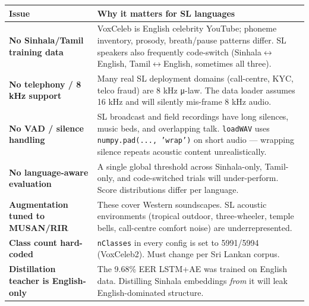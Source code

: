 \documentclass[10pt,a4paper]{article}
\renewcommand{\arraystretch}{1.15}
\begin{document}
\begin{center}
\small
\renewcommand{\arraystretch}{1.25}
\begin{tabularx}{\textwidth}{|Y|Y|}
\hline
Issue & Why it matters for SL languages \\
\hline
\textbf{No Sinhala/Tamil training data} & VoxCeleb is English celebrity YouTube; phoneme inventory, prosody, breath/pause patterns differ. SL speakers also frequently code-switch (Sinhala$\leftrightarrow$English, Tamil$\leftrightarrow$English, sometimes all three). \\
\hline
\textbf{No telephony / 8 kHz support} & Many real SL deployment domains (call-centre, KYC, telco fraud) are 8 kHz μ-law. The data loader assumes 16 kHz and will silently mis-frame 8 kHz audio. \\
\hline
\textbf{No VAD / silence handling} & SL broadcast and field recordings have long silences, music beds, and overlapping talk. \texttt{loadWAV} uses \texttt{numpy.pad(..., 'wrap')} on short audio --- wrapping silence repeats acoustic content unrealistically. \\
\hline
\textbf{No language-aware evaluation} & A single global threshold across Sinhala-only, Tamil-only, and code-switched trials will under-perform. Score distributions differ per language. \\
\hline
\textbf{Augmentation tuned to MUSAN/RIR} & These cover Western soundscapes. SL acoustic environments (tropical outdoor, three-wheeler, temple bells, call-centre comfort noise) are underrepresented. \\
\hline
\textbf{Class count hard-coded} & \texttt{nClasses} in every config is set to 5991/5994 (VoxCeleb2). Must change per Sri Lankan corpus. \\
\hline
\textbf{Distillation teacher is English-only} & The 9.68\% EER LSTM+AE was trained on English data. Distilling Sinhala embeddings \textit{from} it will leak English-dominated structure. \\
\hline
\end{tabularx}
\end{center}
\end{document}
